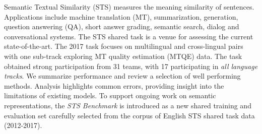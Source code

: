 Semantic Textual Similarity (STS) measures the meaning similarity of sentences. Applications include machine translation (MT), summarization, generation, question answering (QA), short answer grading, semantic search, dialog and conversational systems. The STS shared task is a venue for assessing the current state-of-the-art. The 2017 task focuses on multilingual and cross-lingual pairs with one sub-track exploring MT quality estimation (MTQE) data. The task obtained strong participation from 31 teams, with 17 participating in \emph{all  language tracks}. We summarize performance and review a selection of well performing methods. Analysis highlights common errors, providing insight into the limitations of existing models. To support ongoing work on semantic representations, the {\em STS Benchmark} is introduced as a new shared training and evaluation set carefully selected from the corpus of English STS shared task data (2012-2017).
